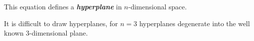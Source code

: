 \documentclass[a4paper,blends,pdf,colorBG,slideColor]{prosper}
\begin{document}
This equation defines a {\bf\em hyperplane} in $n$-dimensional space.

\es

It is difficult to draw hyperplanes, for $n = 3$ hyperplanes degenerate into the well
known $3$-dimensional plane.  

\es
\end{document}
